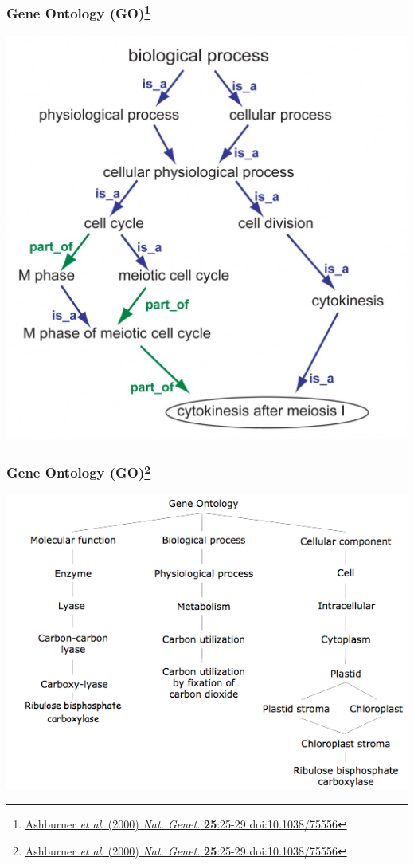 \begin{frame}
  \frametitle{Gene Ontology (GO)\footnote{\tiny{\href{http://dx.doi.org/10.1038/75556}{Ashburner \textit{et al}. (2000) \textit{Nat. Genet.} \textbf{25}:25-29 doi:10.1038/75556}}}}
  \begin{center}
    \includegraphics[height=0.7\textheight]{images/go_example}
  \end{center}
\end{frame}

\begin{frame}
  \frametitle{Gene Ontology (GO)\footnote{\tiny{\href{http://dx.doi.org/10.1038/75556}{Ashburner \textit{et al}. (2000) \textit{Nat. Genet.} \textbf{25}:25-29 doi:10.1038/75556}}}}
  \begin{center}
    \includegraphics[height=0.7\textheight]{images/go_practical_example}
  \end{center}
\end{frame}


